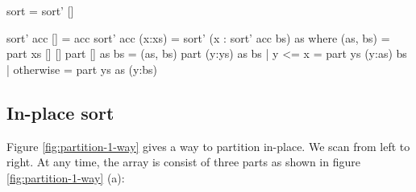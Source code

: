 \documentclass[b5paper]{article}
\begin{document}
\begin{Haskell}
sort = sort' []

sort' acc [] = acc
sort' acc (x:xs) = sort' (x : sort' acc bs) as where
  (as, bs) = part xs [] []
  part [] as bs = (as, bs)
  part (y:ys) as bs | y <= x = part ys (y:as) bs
                    | otherwise = part ys as (y:bs)
\end{Haskell}

\subsection{In-place sort}

Figure \cref{fig:partition-1-way} gives a way to partition in-place\cite{Bentley}\cite{CLRS}. We scan from left to right. At any time, the array is consist of three parts as shown in figure \cref{fig:partition-1-way} (a):
\end{document}
